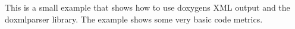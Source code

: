 This is a small example that shows how to use doxygen\textquotesingle{}s X\+M\+L output and the doxmlparser library. The example shows some very basic code metrics. 